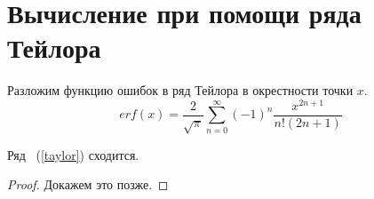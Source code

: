 \section{Вычисление при помощи ряда Тейлора} Разложим функцию ошибок в ряд Тейлора в окрестности точки $x$.
\begin{equation}
	\label{taylor}
	erf(x) = \frac{2}{\sqrt{\pi}}\sum^{\infty}_{n = 0}(-1)^n \frac{x^{2n+1}}{n!(2n+1)}
\end{equation}
\begin{theorem}
	Ряд ~(\ref{taylor}) сходится.
\end{theorem}
\begin{proof}
	Докажем это позже.
\end{proof}